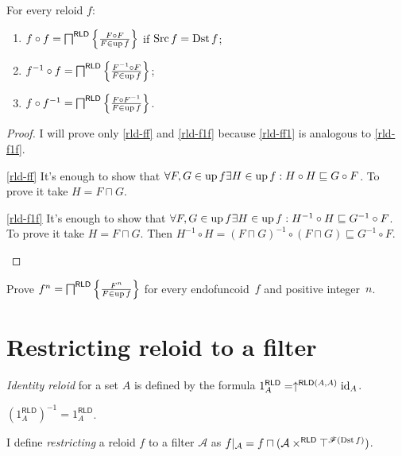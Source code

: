 \begin{thm}
\label{rld-prod-ff}For every reloid $f$:
\begin{enumerate}
\item \label{rld-ff}$f\circ f=\bigsqcap^{\mathsf{RLD}}\left\{ \frac{F\circ F}{F\in\operatorname{up} f}\right\}$
if $\operatorname{Src} f=\operatorname{Dst} f$;
\item \label{rld-f1f}$f^{-1}\circ f=\bigsqcap^{\mathsf{RLD}}\left\{ \frac{F^{-1}\circ F}{F\in\operatorname{up} f}\right\}$;
\item \label{rld-ff1}$f\circ f^{-1}=\bigsqcap^{\mathsf{RLD}}\left\{ \frac{F\circ F^{-1}}{F\in\operatorname{up} f}\right\}$.
\end{enumerate}
\end{thm}
\begin{proof}
I will prove only \ref{rld-ff} and \ref{rld-f1f} because \ref{rld-ff1}
is analogous to \ref{rld-f1f}.
\begin{widedisorder}
\item [{\ref{rld-ff}}] It's enough to show that $\forall F,G\in\operatorname{up} f\exists H\in\operatorname{up} f:H\circ H\sqsubseteq G\circ F$.
To prove it take $H=F\sqcap G$.
\item [{\ref{rld-f1f}}] It's enough to show that $\forall F,G\in\operatorname{up} f\exists H\in\operatorname{up} f:H^{-1}\circ H\sqsubseteq G^{-1}\circ F$.
To prove it take $H=F\sqcap G$. Then $H^{-1}\circ H=(F\sqcap G)^{-1}\circ(F\sqcap G)\sqsubseteq G^{-1}\circ F$.
\end{widedisorder}
\end{proof}
\begin{xca}\label{rld-fn}
Prove $f^n = \bigsqcap^{\mathsf{RLD}}\left\{ \frac{F^n}{F\in\operatorname{up} f}\right\}$ for every endofuncoid~$f$ and positive integer~$n$.
\end{xca}

\section{Restricting reloid to a filter}

\begin{defn}
\emph{Identity reloid} for a set $A$ is defined
by the formula $1_{A}^{\mathsf{RLD}}=\uparrow^{\mathsf{RLD}(A,A)}\operatorname{id}_{A}$.\end{defn}
\begin{obvious}
$(1_{A}^{\mathsf{RLD}})^{-1}=1_{A}^{\mathsf{RLD}}$.\end{obvious}
\begin{defn}
I define \emph{restricting} a reloid $f$
to a filter $\mathcal{A}$ as $f|_{\mathcal{A}}=f\sqcap(\mathcal{A}\times^{\mathsf{RLD}}\top^{\mathscr{F}(\operatorname{Dst} f)})$.
\end{defn}
